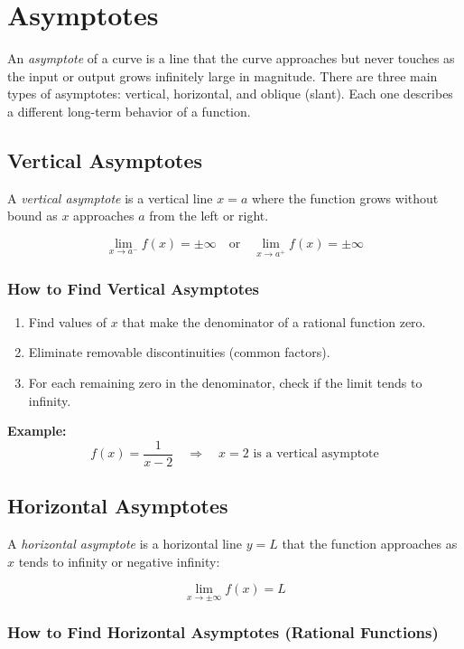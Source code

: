 \newpage
\section{Asymptotes}

An \emph{asymptote} of a curve is a line that the curve approaches but never touches as the input or output grows infinitely large in magnitude. There are three main types of asymptotes: vertical, horizontal, and oblique (slant). Each one describes a different long-term behavior of a function.

\subsection{Vertical Asymptotes}

A \emph{vertical asymptote} is a vertical line \(x = a\) where the function grows without bound as \(x\) approaches \(a\) from the left or right.

\[
\lim_{x \to a^-} f(x) = \pm \infty \quad \text{or} \quad \lim_{x \to a^+} f(x) = \pm \infty
\]

\subsubsection{How to Find Vertical Asymptotes}

\begin{enumerate}
    \item Find values of \(x\) that make the denominator of a rational function zero.
    \item Eliminate removable discontinuities (common factors).
    \item For each remaining zero in the denominator, check if the limit tends to infinity.
\end{enumerate}

\textbf{Example:}
\[
f(x) = \frac{1}{x - 2} \quad \Rightarrow \quad x = 2 \text{ is a vertical asymptote}
\]

\subsection{Horizontal Asymptotes}

A \emph{horizontal asymptote} is a horizontal line \(y = L\) that the function approaches as \(x\) tends to infinity or negative infinity:

\[
\lim_{x \to \pm\infty} f(x) = L
\]

\subsubsection{How to Find Horizontal Asymptotes (Rational Functions)}

